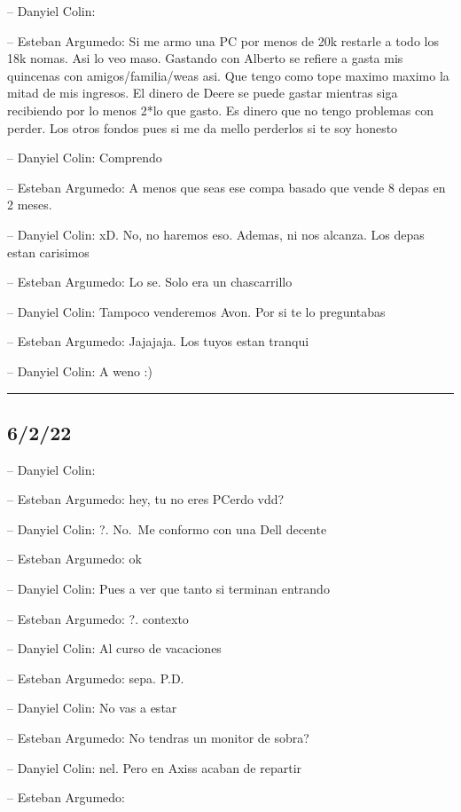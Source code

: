 -- Danyiel Colin:

-- Esteban Argumedo: Si me armo una PC por menos de 20k restarle a todo
los 18k nomas. Asi lo veo maso. Gastando con Alberto se refiere a gasta
mis quincenas con amigos/familia/weas asi. Que tengo como tope maximo
maximo la mitad de mis ingresos. El dinero de Deere se puede gastar
mientras siga recibiendo por lo menos 2*lo que gasto. Es dinero que no
tengo problemas con perder. Los otros fondos pues si me da mello
perderlos si te soy honesto

-- Danyiel Colin: Comprendo

-- Esteban Argumedo: A menos que seas ese compa basado que vende 8 depas
en 2 meses.

-- Danyiel Colin: xD. No, no haremos eso. Ademas, ni nos alcanza. Los
depas estan carisimos

-- Esteban Argumedo: Lo se. Solo era un chascarrillo

-- Danyiel Colin: Tampoco venderemos Avon. Por si te lo preguntabas

-- Esteban Argumedo: Jajajaja. Los tuyos estan tranqui

-- Danyiel Colin: A weno :)

\begin{center}\rule{0.5\linewidth}{0.5pt}\end{center}

\hypertarget{section-92}{%
\subsection{6/2/22}\label{section-92}}

-- Danyiel Colin:

-- Esteban Argumedo: hey, tu no eres PCerdo vdd?

-- Danyiel Colin: ?. No.~Me conformo con una Dell decente

-- Esteban Argumedo: ok

-- Danyiel Colin: Pues a ver que tanto si terminan entrando

-- Esteban Argumedo: ?. contexto

-- Danyiel Colin: Al curso de vacaciones

-- Esteban Argumedo: sepa. P.D.

-- Danyiel Colin: No vas a estar

-- Esteban Argumedo: No tendras un monitor de sobra?

-- Danyiel Colin: nel. Pero en Axiss acaban de repartir

-- Esteban Argumedo:

